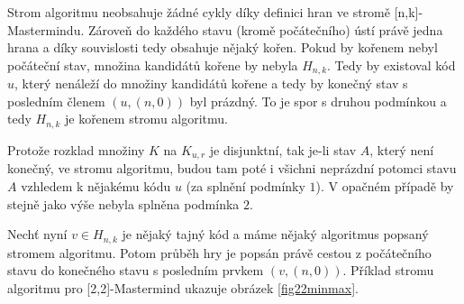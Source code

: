 




\begin{pozn}
    
    

    Strom algoritmu neobsahuje žádné cykly díky definici hran ve stromě [n,k]-Mastermindu. Zároveň do každého stavu (kromě počátečního) ústí právě jedna hrana a díky souvislosti tedy obsahuje nějaký kořen. Pokud by kořenem nebyl počáteční stav, množina kandidátů kořene by nebyla $H_{n,k}$. Tedy by existoval kód $u$, který nenáleží do množiny kandidátů kořene a tedy by konečný stav s posledním členem $(u, (n,0))$ byl prázdný. To je spor s druhou podmínkou a tedy $H_{n,k}$ je kořenem stromu algoritmu. 

    Protože rozklad množiny $K$ na $K_{u,r}$ je disjunktní, tak je-li stav $A$, který není konečný, ve stromu algoritmu, budou tam poté i všichni neprázdní potomci stavu $A$ vzhledem k nějakému kódu $u$ (za splnění podmínky $1$). V opačném případě by stejně jako výše nebyla splněna podmínka $2$.
    
    Nechť nyní $v\in H_{n,k}$ je nějaký tajný kód a máme nějaký algoritmus popsaný stromem algoritmu. Potom průběh hry je popsán právě cestou z počátečního stavu do konečného stavu s posledním prvkem $(v,(n,0))$. Příklad stromu algoritmu pro [2,2]-Mastermind ukazuje obrázek \ref{fig22minmax}. 
    

    
\end{pozn}


